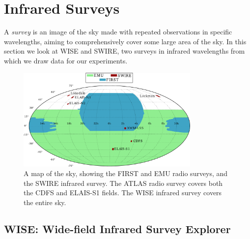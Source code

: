 

    \section{Infrared Surveys}
    \label{sec:infrared-surveys}

        A \emph{survey} is an image of the sky made with repeated observations
        in specific wavelengths, aiming to comprehensively cover some large area
        of the sky. In this section we look at WISE and SWIRE, two surveys in
        infrared wavelengths from which we draw data for our experiments.

        \begin{figure}
            \centering
            \includegraphics[width=0.8\textwidth]{images/skymap2.pdf}
            \caption{A map of the sky, showing the FIRST and EMU radio surveys,
                and the SWIRE infrared survey. The ATLAS radio survey
                covers both the CDFS and ELAIS-S1 fields. The WISE infrared
                survey covers the entire sky.}
        \end{figure}

        \subsection{WISE: Wide-field Infrared Survey Explorer}
        \label{sec:wise}

